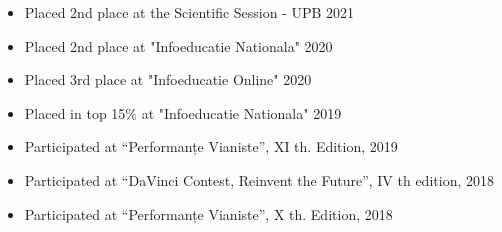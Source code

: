 \documentclass[10pt,a4paper,ragged2e]{resume}
\begin{document}
    \smallskip
    \begin{itemize}
        \item Placed 2nd place at the Scientific Session - UPB 2021
        \item Placed 2nd place at "Infoeducatie Nationala" 2020
        \item Placed 3rd place at "Infoeducatie Online" 2020
        \item Placed in top 15\% at "Infoeducatie Nationala" 2019
        \item Participated at \textquotedblleft Performanțe Vianiste\textquotedblright, XI th. Edition, 2019
        \item Participated at \textquotedblleft DaVinci Contest, Reinvent the Future\textquotedblright, IV th edition, 2018
        \item Participated at \textquotedblleft Performanțe Vianiste\textquotedblright, X th. Edition, 2018
    \end{itemize}

    \smallskip
    \smallskip
    \smallskip
    \smallskip
    \smallskip
\end{document}
